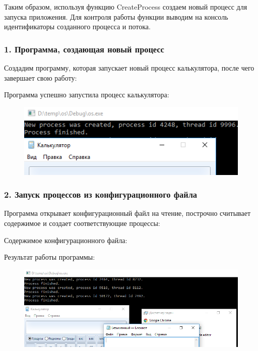\documentclass[14pt,a4paper,report]{report}
\begin{document}
Таким образом, используя функцию CreateProcess создаем новый процесс для запуска приложения. Для контроля работы функции выводим на консоль идентификаторы созданного процесса и потока.

\subsubsection{1. Программа, создающая новый процесс}

Создадим программу, которая запускает новый процесс калькулятора, после чего завершает свою работу:



Программа успешно запустила процесс калькулятора:

\begin{figure}[h!]
	\centering
	\includegraphics[scale = 1.05]{images/p1_1.png}
	
	\caption{}
	\label{image:2}
\end{figure}

\subsubsection{2. Запуск процессов из конфигурационного файла}

Программа открывает конфигурационный файл на чтение, построчно считывает содержимое и создает соответствующие процессы:



Содержимое конфигурационного файла:



Результат работы программы:

\begin{figure}[h!]
	\centering
	\includegraphics[scale = 0.75]{images/p1_2.png}
	
	\caption{}
	\label{image:3}
\end{figure}
\end{document}
